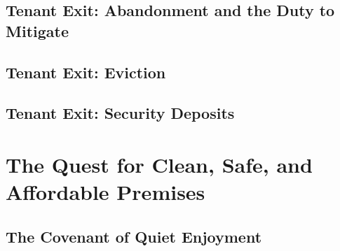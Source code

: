 \begin{questions}

\end{questions}

\subsection{Tenant Exit: Abandonment and the Duty to Mitigate}





\begin{questions}

\end{questions}



\subsection{Tenant Exit: Eviction}





\begin{questions}

\end{questions}



\subsection{Tenant Exit: Security Deposits}





\begin{questions}

\end{questions}



\section{The Quest for Clean, Safe, and Affordable Premises}



\subsection{The Covenant of Quiet Enjoyment}



